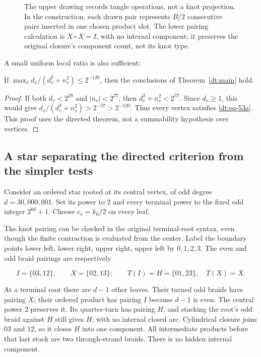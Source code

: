 \begin{figure}[t]
\centering
\caption{The upper drawing records tangle operations, not a knot
projection. In the construction, each drawn pair represents \(B/2\)
consecutive pairs inserted in one chosen product slot. The lower
pairing calculation is \(X\circ X=I\), with no internal component;
it preserves the original closure's component count, not its knot type.}
\label{dt:leaves-figure}
\end{figure}

A small uniform local ratio is also sufficient:
\begin{corollary}\label{dt:local}
If \(\max_v d_v/(d_v^2+n_v^2)\le2^{-120}\), then the conclusions
of Theorem~\ref{dt:main} hold.
\end{corollary}
\begin{proof}
If both \(d_v<2^{28}\) and \(|n_v|<2^{27}\), then
\(d_v^2+n_v^2<2^{57}\). Since \(d_v\ge1\), this would give
\(d_v/(d_v^2+n_v^2)>2^{-57}>2^{-120}\). Thus every vertex
satisfies \eqref{dt:eq-53a}. This proof uses the directed theorem,
not a summability hypothesis over vertices.
\end{proof}

\subsection{A star separating the directed criterion from the simpler tests}\label{dt:sec-9}

Consider an ordered star rooted at its central vertex, of odd degree
\(d=30{,}000{,}001\). Set its power to 2 and every terminal power to the fixed
odd integer \(2^{60}+1\). Choose \(c_v=k_0/2\) on every leaf.

The knot pairing can be checked in the original terminal-root syntax,
even though the finite contraction is evaluated from the center. Label
the boundary points lower left, lower right, upper right, upper left
by \(0,1,2,3\). The even and odd braid pairings are respectively

\begin{equation}\label{dt:eq-54a}
I=\{03,12\},\qquad X=\{02,13\};\qquad
 T(I)=H=\{01,23\},\quad T(X)=X.
\end{equation}

At a terminal root there are \(d-1\) other leaves. Their turned odd
braids have pairing \(X\); their ordered product has pairing \(I\)
because \(d-1\) is even. The central power \(2\) preserves it. Its
quarter-turn has pairing \(H\), and stacking the root's odd
braid against \(H\) still gives \(H\), with no internal closed arc.
Cylindrical closure joins \(03\) and \(12\), so it closes \(H\)
into one component. All intermediate products before that last stack
are two through-strand braids. There is no hidden internal component.

